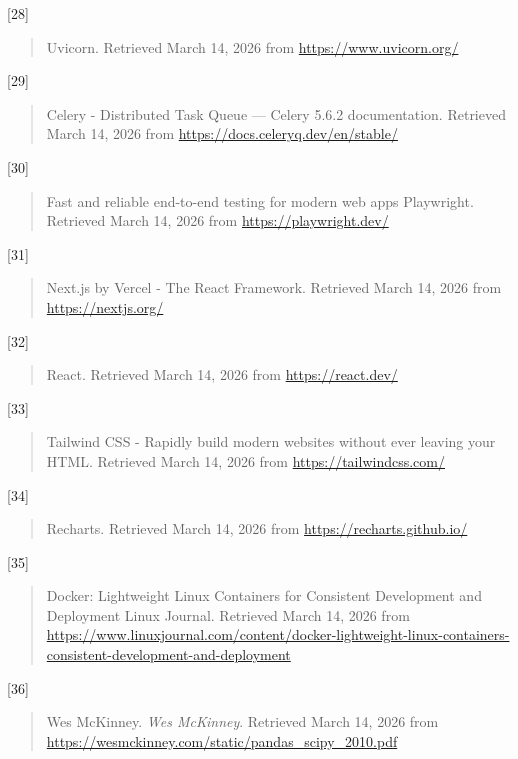 {[}28{]}

\begin{quote}
Uvicorn. Retrieved March 14, 2026 from \url{https://www.uvicorn.org/}
\end{quote}

{[}29{]}

\begin{quote}
Celery - Distributed Task Queue --- Celery 5.6.2 documentation. Retrieved March 14, 2026 from \url{https://docs.celeryq.dev/en/stable/}
\end{quote}

{[}30{]}

\begin{quote}
Fast and reliable end-to-end testing for modern web apps \textbar{} Playwright. Retrieved March 14, 2026 from \url{https://playwright.dev/}
\end{quote}

{[}31{]}

\begin{quote}
Next.js by Vercel - The React Framework. Retrieved March 14, 2026 from \url{https://nextjs.org/}
\end{quote}

{[}32{]}

\begin{quote}
React. Retrieved March 14, 2026 from \url{https://react.dev/}
\end{quote}

{[}33{]}

\begin{quote}
Tailwind CSS - Rapidly build modern websites without ever leaving your HTML. Retrieved March 14, 2026 from \url{https://tailwindcss.com/}
\end{quote}

{[}34{]}

\begin{quote}
Recharts. Retrieved March 14, 2026 from \url{https://recharts.github.io/}
\end{quote}

{[}35{]}

\begin{quote}
Docker: Lightweight Linux Containers for Consistent Development and Deployment \textbar{} Linux Journal. Retrieved March 14, 2026 from \url{https://www.linuxjournal.com/content/docker-lightweight-linux-containers-consistent-development-and-deployment}
\end{quote}

{[}36{]}

\begin{quote}
Wes McKinney. \emph{Wes McKinney}. Retrieved March 14, 2026 from \url{https://wesmckinney.com/static/pandas_scipy_2010.pdf}
\end{quote}

